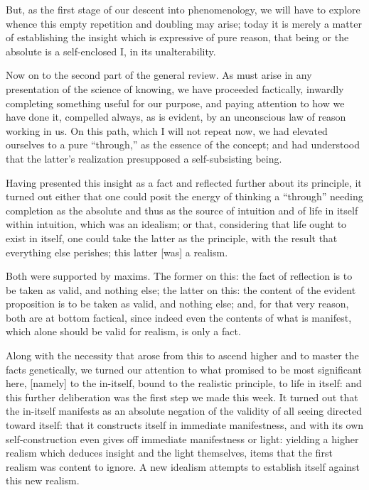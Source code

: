 But, as the first stage of our descent into phenomenology,
we will have to explore whence this
empty repetition and doubling may arise;
today it is merely a matter of establishing the insight
which is expressive of pure reason, that being or the absolute is
a self-enclosed I, in its unalterability.

Now on to the second part of the general review.
As must arise in any presentation of the science of knowing,
we have proceeded factically, inwardly completing
something useful for our purpose,
and paying attention to how we have done it,
compelled always, as is evident, by
an unconscious law of reason working in us.
On this path, which I will not repeat now,
we had elevated ourselves to a pure “through,”
as the essence of the concept;
and had understood that the latter's realization
presupposed a self-subsisting being.

Having presented this insight as a fact
and reflected further about its principle,
it turned out either that one could posit
the energy of thinking a “through” needing
completion as the absolute
and thus as the source of intuition
and of life in itself within intuition,
which was an idealism;
or that, considering that life ought to exist in itself,
one could take the latter as the principle,
with the result that everything else perishes;
this latter [was] a realism.

Both were supported by maxims.
The former on this: the fact of reflection is
to be taken as valid, and nothing else;
the latter on this:
the content of the evident proposition is
to be taken as valid, and nothing else;
and, for that very reason, both are at bottom factical,
since indeed even the contents of what is manifest,
which alone should be valid for realism, is only a fact.

Along with the necessity that arose from this
to ascend higher and to master the facts genetically,
we turned our attention to what promised to be most significant here,
[namely] to the in-itself, bound to the realistic principle,
to life in itself:
and this further deliberation was the first step we made this week.
It turned out that the in-itself manifests as an absolute
negation of the validity of all seeing directed toward itself:
that it constructs itself in immediate manifestness,
and with its own self-construction even gives
off immediate manifestness or light:
yielding a higher realism which deduces
insight and the light themselves,
items that the first realism was content to ignore.
A new idealism attempts to establish itself
against this new realism.

